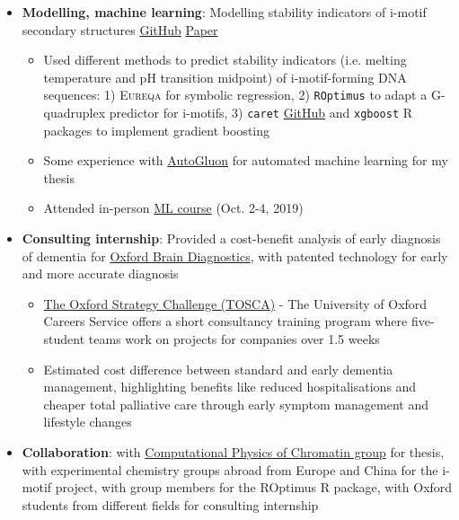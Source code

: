 \documentclass[legalpaper,11pt]{article}
\newcommand{\resumeItem}[2]{
  \item\small{
    \textbf{#1}{: #2 \vspace{-2pt}}
  }
}
\newcommand{\resumeItemListStart}{\begin{itemize}}
\newcommand{\resumeItemListEnd}{\end{itemize}\vspace{-5pt}}
\begin{document}
            \resumeItemListStart
                \resumeItem{Modelling, machine learning}{Modelling stability indicators of i-motif secondary structures \href{https://github.com/SahakyanLab/iMotif_dev}{GitHub} \href{https://doi.org/10.1002/anie.202016801}{Paper}}
                    \begin{itemize}
                        \item {Used different methods to predict stability indicators (i.e. melting temperature and pH transition midpoint) of i-motif-forming DNA sequences: 1) \textsc{Eureqa} for symbolic regression, 2) \texttt{ROptimus} to adapt a G-quadruplex predictor for i-motifs, 3) \texttt{caret} \href{https://github.com/liezeltamon/ml-lib}{GitHub} and \texttt{xgboost} R packages to implement gradient boosting}
                        \item {Some experience with \href{https://github.com/autogluon/autogluon}{AutoGluon} for automated machine learning for my thesis}
                        \item {Attended in-person \href{https://training.cam.ac.uk/course/bioinfo-ml}{ML course} (Oct. 2-4, 
                        2019)}
                    \end{itemize}
            \resumeItemListEnd
            
            \resumeItemListStart
                \resumeItem{Consulting internship}{Provided a cost-benefit analysis of early diagnosis of dementia for \href{https://www.oxfordbraindiagnostics.com/}{Oxford Brain Diagnostics}, with patented technology for early and more accurate diagnosis}
                    \begin{itemize}
                        \item {\href{https://www.careers.ox.ac.uk/oxford-strategy-challenge}{The Oxford Strategy Challenge (TOSCA)} - The University of Oxford Careers Service offers a short consultancy training program where five-student teams work on projects for companies over 1.5 weeks}
                        \item {Estimated cost difference between standard and early dementia management, highlighting benefits like reduced hospitalisations and cheaper total palliative care through early symptom management and lifestyle changes}
                    \end{itemize}
            \resumeItemListEnd
    
            \resumeItemListStart
                \resumeItem{Collaboration}{with \href{http://www.collepardolab.org/}{Computational Physics of Chromatin group} for thesis, with experimental chemistry groups abroad from Europe and China for the i-motif project, with group members for the ROptimus R package, with Oxford students from different fields for consulting internship}
            \resumeItemListEnd
\end{document}
